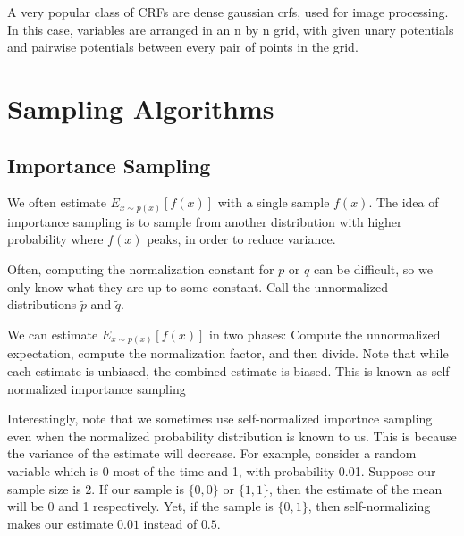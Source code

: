 \documentclass[12pt]{article}
\begin{document}
A very popular class of CRFs are dense gaussian crfs, used for image processing. In this case, variables are arranged in an n by n grid, with given unary potentials and pairwise potentials between every pair of points in the grid.

\section{Sampling Algorithms}

\subsection{Importance Sampling}

We often estimate $E_{x \sim p(x)}[f(x)]$
with a single sample $f(x)$. The idea of importance sampling is to sample from another distribution with higher probability where $f(x)$ peaks, in order to reduce variance.


Often, computing the normalization constant for $p$ or $q$ can be difficult, so we only know what they are up to some constant. Call the unnormalized distributions $\tilde p$ and $\tilde q$. 

We can estimate $E_{x \sim p(x)}[f(x)]$ in two phases: Compute the unnormalized expectation, compute the normalization factor, and then divide. Note that while each estimate is unbiased, the combined estimate is biased. This is known as self-normalized importance sampling


Interestingly, note that we sometimes use self-normalized importnce sampling even when the normalized probability distribution is known to us. This is because the variance of the estimate will decrease. For example, consider a random variable which is 0 most of the time and 1, with probability 0.01. Suppose our sample size is 2. If our sample is $\{0,0\}$ or $\{1,1\}$, then the estimate of the mean will be 0 and 1 respectively. Yet, if the sample is $\{0,1\}$, then self-normalizing makes our estimate $0.01$ instead of $0.5$.
\end{document}
